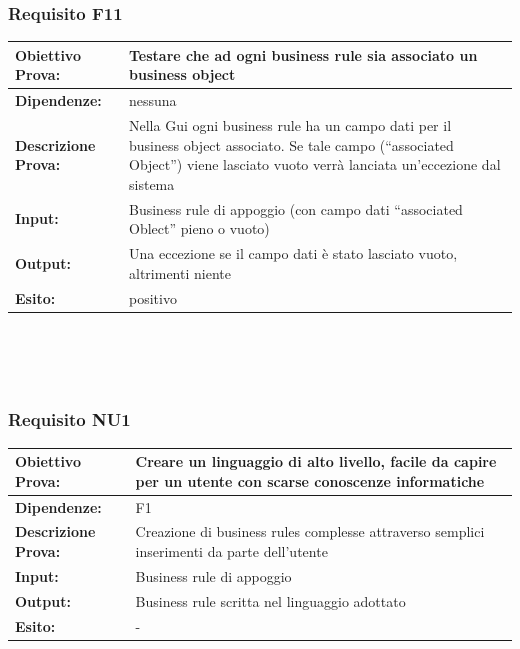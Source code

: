 \documentclass[11pt,titlepage,a4paper]{report}
\begin{document}
\subsubsection{Requisito F11}
\begin{tabular}{||p{4.5cm}||p{7.5cm}||}
\hline
{\textbf {Obiettivo Prova:}}& Testare che ad ogni business rule sia associato un business object \\ \hline
{\textbf{Dipendenze:}}& nessuna \\ \hline
{\textbf{Descrizione Prova:}}&  Nella Gui ogni business rule ha un campo dati per il business object associato. Se tale campo (``associated Object'') viene lasciato vuoto verr\`a lanciata un'eccezione dal sistema\\ \hline
{\textbf{Input:}}&  Business rule di appoggio (con campo dati ``associated Oblect'' pieno o vuoto)\\ \hline
{\textbf{Output:}}& Una eccezione se il campo dati \`e stato lasciato vuoto, altrimenti niente \\ \hline
{\textbf{Esito:}}& positivo \\ \hline
\end{tabular} \\
\\
\\
\subsubsection{Requisito NU1}
\begin{tabular}{||p{4.5cm}||p{7.5cm}||}
\hline
{\textbf {Obiettivo Prova:}}& Creare un linguaggio di alto livello, facile da capire per un utente con scarse conoscenze informatiche\\ \hline
{\textbf{Dipendenze:}}& F1\\ \hline
{\textbf{Descrizione Prova:}}& Creazione di business rules complesse attraverso semplici inserimenti da parte dell'utente\\ \hline
{\textbf{Input:}}& Business rule di appoggio \\ \hline
{\textbf{Output:}}& Business rule scritta nel linguaggio adottato \\ \hline
{\textbf{Esito:}}& - \\ \hline
\end{tabular} \\
\\
\\
\end{document}
